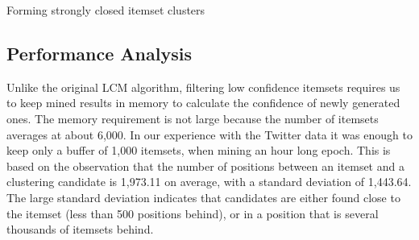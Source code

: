 \documentclass{sig-alternate}
\begin{document}
\begin{algorithm}[t]
\SetAlgoLined
\LinesNumbered
{} 
\;
\caption{Forming strongly closed itemset clusters}
\label{algo:alliance}
\end{algorithm}



\subsection{Performance Analysis}
\label{sec:bounding}



Unlike the original LCM algorithm, filtering low confidence itemsets requires
us to keep mined results in memory to calculate the confidence of newly
generated ones.
The memory requirement is not large because the number of itemsets 
averages at about 6,000.
In our experience with the Twitter data it was enough to keep only a buffer
of 1,000 itemsets, when mining an hour long epoch.
This is based on the observation that the number of positions 
between an itemset and a clustering candidate 
is 1,973.11 on average, with a standard deviation of 1,443.64. 
The large standard deviation indicates that
candidates are either found close to the itemset
(less than 500 positions behind),
or in a position that is several thousands 
of itemsets behind. 
\end{document}
